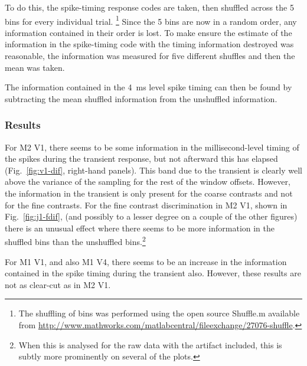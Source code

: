 To do this, the spike-timing response codes are taken, then shuffled across the 5 bins for every individual trial.%
\footnote{The shuffling of bins was performed using the open source Shuffle.m
available from \url{http://www.mathworks.com/matlabcentral/fileexchange/27076-shuffle}.}
Since the 5 bins are now in a random order, any information contained in their order is lost.
To make ensure the estimate of the information in the spike-timing code with the timing information destroyed was reasonable, the information was measured for five different shuffles%
 and then the mean was taken.

The information contained in the \SI{4}{ms} level spike timing can then be found by subtracting the mean shuffled information from the unshuffled information.


\subsubsection{Results}

For \ac{M2} \ac{V1}, there seems to be some information in the millisecond-level timing of the spikes during the transient response, but not afterward this has elapsed (Fig.~\ref{fig:v1-dif}, right-hand panels).
This band due to the transient is clearly well above the variance of the sampling for the rest of the window offsets.
However, the information in the transient is only present for the coarse contrasts and not for the fine contrasts.
For the fine contrast discrimination in \ac{M2} \ac{V1}, shown in Fig.~\ref{fig:j1-fdif}, (and possibly to a lesser degree on a couple of the other figures) there is an unusual effect where there seems to be more information in the shuffled bins than the unshuffled bins.\footnote{When this is analysed for the raw data with the artifact included, this is subtly more prominently on several of the plots.}

For \ac{M1} \ac{V1}, and also \ac{M1} \ac{V4}, there seems to be an increase in the information contained in the spike timing during the transient also.
However, these results are not as clear-cut as in \ac{M2} \ac{V1}.

